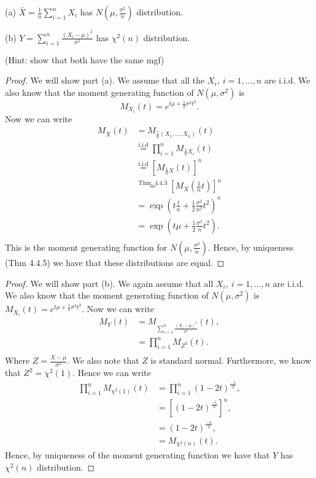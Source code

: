 \documentclass{article}
\newcommand{\randsamp}{X_1,\dots,X_n}
\newcommand{\mgf}{moment generating function }
\begin{document}
(a) $\bar{X} = \frac{1}{n} \sum_{i=1}^n X_i$ has $N(\mu, \frac{\sigma^2}{n})$ distribution.

(b) $Y = \sum_{i=1}^n \frac{(X_i - \mu)^2}{\sigma^2}$ has $\chi^2(n)$ distribution.

(Hint: show that both have the same mgf)

\begin{proof}
    We will show part (a). We assume that all the $X_i, \ i = 1,\dots,n$ are i.i.d.
    We also know that the \mgf of $N(\mu, \sigma^2)$ is
    \[M_{X_i}(t) = e^{t\mu + \frac{1}{2}\sigma^2t^2}.\] Now we can write
    \begin{align*}
        M_{\bar{X}}(t) & = M_{\frac{1}{n}(\randsamp)}(t)                                        \\
                       & \stackrel{\text{i.i.d}}{=} \prod_{i=1}^n M_{\frac{1}{n}X_i}(t)         \\
                       & \stackrel{\text{i.i.d}}{=} [M_{\frac{1}{n}X}(t)]^n                     \\
                       & \stackrel{\text{Thm. 4.4.3}}{=} [M_X(\frac{1}{n}t)]^n                  \\
                       & = \exp\left(t\frac{t}{n} + \frac{1}{2}\frac{\sigma^2}{n^2}t^2\right)^n \\
                       & = \exp\left(t\mu + \frac{1}{2}\frac{\sigma^2}{n}t^2\right).            \\
    \end{align*}
    This is the \mgf for $N(\mu, \frac{\sigma^2}{n})$. Hence, by uniqueness (Thm 4.4.5) we
    have that these distributions are equal.
\end{proof}

\begin{proof}
    We will show part (b). We again assume that all $X_i, \ i = 1,\dots,n$ are i.i.d.
    We also know that the \mgf of $N(\mu, \sigma^2)$ is
    $M_{X_i}(t) = e^{t\mu + \frac{1}{2}\sigma^2t^2}$. Now we can write
    \begin{align*}
        M_Y(t) & = M_{\sum_{i=1}^n\frac{(X_i - \mu)^2}{\sigma^2}}(t), \\
               & = \prod_{i=1}^n M_{Z^2}(t).                          \\
    \end{align*}
    Where $Z = \frac{X - \mu}{\sigma^2}$. We also note that $Z$ is standard normal.
    Furthermore, we know that $Z^2 = \chi^2(1)$. Hence we can write
    \begin{align*}
        \prod_{i=1}^n M_{\chi^2(1)}(t) & =\prod_{i=1}^n (1-2t)^{\frac{-1}{2}},   \\
                                       & = \left[(1-2t)^{\frac{-1}{2}}\right]^n, \\
                                       & = (1-2t)^{\frac{-n}{2}},                \\
                                       & = M_{\chi^2(n)}(t).
    \end{align*}
    Hence, by uniqueness of the \mgf we have that $Y$ has $\chi^2(n)$ distribution.
\end{proof}
\end{document}
